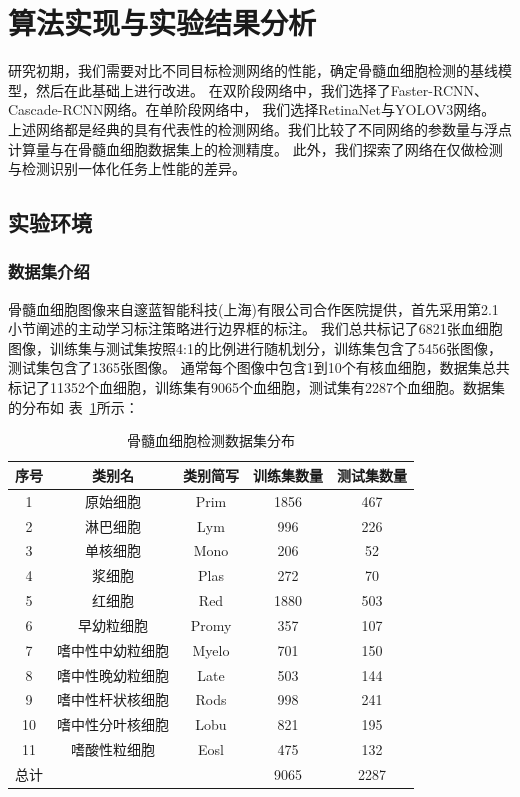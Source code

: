 \section{算法实现与实验结果分析}

研究初期，我们需要对比不同目标检测网络的性能，确定骨髓血细胞检测的基线模型，然后在此基础上进行改进。
在双阶段网络中，我们选择了Faster-RCNN\cite{ren2015faster}、Cascade-RCNN\cite{cai2018cascade}网络。在单阶段网络中，
我们选择RetinaNet\cite{lin2017focal}与YOLOV3\cite{redmon2018yolov3}网络。
上述网络都是经典的具有代表性的检测网络。我们比较了不同网络的参数量与浮点计算量与在骨髓血细胞数据集上的检测精度。
此外，我们探索了网络在仅做检测与检测识别一体化任务上性能的差异。

\subsection{实验环境}

\subsubsection{数据集介绍}
\label{section:dataset}

骨髓血细胞图像来自邃蓝智能科技(上海)有限公司合作医院提供，首先采用第2.1小节阐述的主动学习标注策略进行边界框的标注。
我们总共标记了6821张血细胞图像，训练集与测试集按照4:1的比例进行随机划分，训练集包含了5456张图像，测试集包含了1365张图像。
通常每个图像中包含1到10个有核血细胞，数据集总共标记了11352个血细胞，训练集有9065个血细胞，测试集有2287个血细胞。数据集的分布如
表~\ref{table:cell_detect}所示：

\begin{table}[htbp]
  \caption{骨髓血细胞检测数据集分布}   
  \centering 
  \label{table:cell_detect}
  \begin{tabular}{ccccc}
    \toprule[2pt]
    序号 & 类别名  &  类别简写 & 训练集数量 & 测试集数量 \\
    \midrule[1.5pt] 
    1 & 原始细胞 & Prim & 1856 & 467 \\ 
    2 & 淋巴细胞 & Lym & 996 & 226   \\ 
    3 & 单核细胞 & Mono & 206 & 52   \\ 
    4 & 浆细胞 & Plas & 272 & 70   \\ 
    5 & 红细胞 & Red & 1880 & 503   \\ 
    6 & 早幼粒细胞 & Promy & 357 & 107   \\ 
    7 & 嗜中性中幼粒细胞 & Myelo & 701 & 150   \\ 
    8 & 嗜中性晚幼粒细胞 & Late & 503 & 144   \\ 
    9 & 嗜中性杆状核细胞 & Rods & 998 & 241   \\  
    10 & 嗜中性分叶核细胞 & Lobu & 821 & 195   \\  
    11 & 嗜酸性粒细胞 & Eosl & 475 & 132   \\  
    \hline
    总计 &   &   & 9065 & 2287 \\
    \bottomrule[2pt]      
  \end{tabular} 
\end{table}

